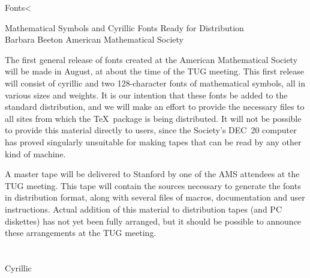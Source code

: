 
\sectitle Fonts<

\Title	Mathematical Symbols\cr
	and Cyrillic Fonts\cr
	Ready for Distribution
\\Barbara Beeton\cr
	American Mathematical Society
\endx



The first general release of fonts created at the American Mathematical
Society will be made in August, at about the time of the TUG meeting.
This first release will consist of cyrillic and two 128-character fonts of
mathematical symbols, all in various sizes and weights.  It is our
intention that these fonts be added to the standard distribution, and
we will make an effort to provide the necessary files to all sites from
which the \TeX\ package is being distributed.  It will not be possible to
provide this material directly to users, since the Society's DEC~20
computer has proved singularly unsuitable for making tapes that can be
read by any other kind of machine.

A master tape will be delivered to Stanford by one of the AMS
attendees at the TUG meeting.  This tape will contain the  sources
necessary to generate the fonts in distribution format, along with
several files of macros, documentation and user instructions.  Actual
addition of this material to distribution tapes (and PC diskettes) has
not yet been fully arranged, but it should be possible to announce
these arrangements at the TUG meeting.

\section {} Cyrillic

